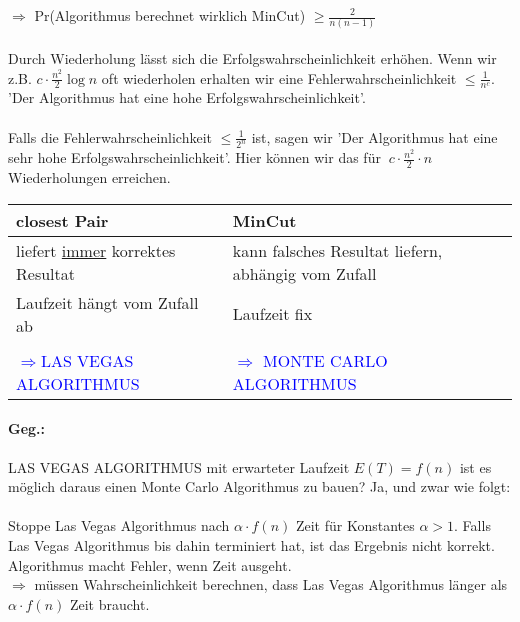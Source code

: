 $\Rightarrow$ Pr(Algorithmus berechnet wirklich MinCut) $\geq \frac{2}{n(n-1)}$
\paragraph*{}
 Durch Wiederholung lässt sich die Erfolgswahrscheinlichkeit erhöhen. Wenn wir z.B. $c \cdot \frac{n^2}{2} \log n$ oft wiederholen erhalten wir eine Fehlerwahrscheinlichkeit $\leq \frac{1}{n^c}$. 'Der Algorithmus hat eine hohe Erfolgswahrscheinlichkeit'.
\paragraph*{} Falls die Fehlerwahrscheinlichkeit $\leq \frac{1}{2^n}$ ist, sagen wir 'Der Algorithmus hat eine sehr hohe Erfolgswahrscheinlichkeit'. Hier können wir das für $~ c \cdot \frac{n^2}{2} \cdot n$ Wiederholungen erreichen.

\begin{table}
\centering
\begin{tabular}{l|l}
closest Pair & MinCut \\
\hline
\hline
liefert \underline{immer} korrektes Resultat & kann falsches Resultat liefern, abhängig vom Zufall \\
\hline
Laufzeit hängt vom Zufall ab & Laufzeit fix \\
& \\
\textcolor{blue}{$\Rightarrow$LAS VEGAS ALGORITHMUS} & \textcolor{blue}{$\Rightarrow$ MONTE CARLO ALGORITHMUS} \\
\end{tabular}
\end{table}

\paragraph*{Geg.:} LAS VEGAS ALGORITHMUS mit erwarteter Laufzeit $E(T) = f(n)$ ist es möglich daraus einen Monte Carlo Algorithmus zu bauen? Ja, und zwar wie folgt:
\paragraph*{} Stoppe Las Vegas Algorithmus nach $\alpha \cdot f(n)$ Zeit für Konstantes $\alpha > 1$. Falls Las Vegas Algorithmus bis dahin terminiert hat, ist das Ergebnis nicht korrekt. Algorithmus macht Fehler, wenn Zeit ausgeht. \\
$\Rightarrow$ müssen Wahrscheinlichkeit berechnen, dass Las Vegas Algorithmus länger als $\alpha \cdot f(n)$ Zeit braucht.

